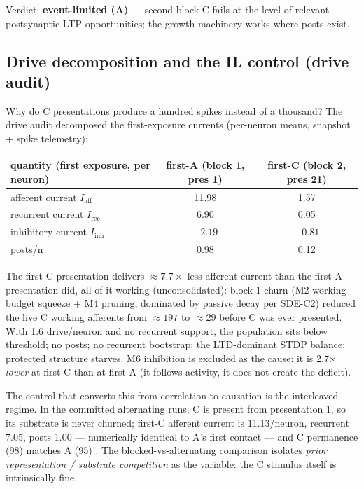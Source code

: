 Verdict: \textbf{event-limited (A)} --- second-block C fails at the
level of relevant postsynaptic LTP opportunities; the growth machinery
works where posts exist.

\subsection{Drive decomposition and the IL control (drive audit)}

Why do C presentations produce a hundred spikes instead of a thousand?
The drive audit \cite{drive} decomposed the first-exposure currents
(per-neuron means, snapshot + spike telemetry):

\begin{center}
\footnotesize
\begin{tabular}{lcc}
\toprule
quantity (first exposure, per neuron) & first-A (block 1, pres 1) & first-C (block 2, pres 21) \\
\midrule
afferent current \(I_{\mathrm{aff}}\) & 11.98 & 1.57 \\
recurrent current \(I_{\mathrm{rec}}\) & 6.90 & 0.05 \\
inhibitory current \(I_{\mathrm{inh}}\) & \(-2.19\) & \(-0.81\) \\
posts/n & 0.98 & 0.12 \\
\bottomrule
\end{tabular}
\end{center}

The first-C presentation delivers \(\approx 7.7\times\) less afferent
current than the first-A presentation did, all of it working
(unconsolidated): block-1 churn (M2 working-budget squeeze + M4
pruning, dominated by passive decay per SDE-C2) reduced the live C
working afferents from \(\approx 197\) to \(\approx 29\) before C was
ever presented. With 1.6 drive/neuron and no recurrent support, the
population sits below threshold; no posts; no recurrent bootstrap; the
LTD-dominant STDP balance; protected structure starves. M6 inhibition is
excluded as the cause: it is 2.7\(\times\) \emph{lower} at first C than
at first A (it follows activity, it does not create the deficit).

The control that converts this from correlation to causation is the
interleaved regime. In the committed alternating runs, C is present
from presentation 1, so its substrate is never churned; first-C
afferent current is 11.13/neuron, recurrent 7.05, posts 1.00 ---
numerically identical to A's first contact --- and C permanence (98)
matches A (95) \cite{drive}. The blocked-vs-alternating comparison
isolates \emph{prior representation / substrate competition} as the
variable: the C stimulus itself is intrinsically fine.

